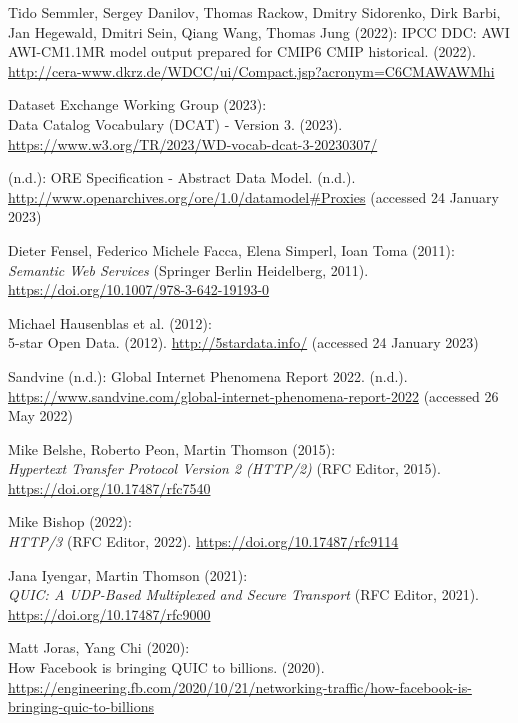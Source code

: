 \begin{thebibliography}{9}
Tido Semmler, Sergey Danilov, Thomas Rackow, Dmitry Sidorenko, Dirk
Barbi, Jan Hegewald, Dmitri Sein, Qiang Wang, Thomas Jung (2022):
IPCC DDC: AWI AWI-CM1.1MR model output prepared for CMIP6 CMIP
historical. (2022).
\url{http://cera-www.dkrz.de/WDCC/ui/Compact.jsp?acronym=C6CMAWAWMhi}

Dataset Exchange Working Group (2023): \\
{Data Catalog Vocabulary ({DCAT})
- Version 3}. (2023).
\url{https://www.w3.org/TR/2023/WD-vocab-dcat-3-20230307/}

(n.d.): {ORE Specification} - {Abstract Data Model}. (n.d.).
\url{http://www.openarchives.org/ore/1.0/datamodel\#Proxies} (accessed
24 January 2023)

Dieter Fensel, Federico Michele Facca, Elena Simperl, Ioan Toma
(2011): \\
\emph{Semantic {Web Services}} ({Springer Berlin Heidelberg},
2011).
\url{https://doi.org/10.1007/978-3-642-19193-0}

Michael Hausenblas et al. (2012): \\
5-star {Open Data}. (2012).
\url{http://5stardata.info/} (accessed 24 January 2023)

Sandvine (n.d.): Global {Internet Phenomena Report} 2022. (n.d.).
\url{https://www.sandvine.com/global-internet-phenomena-report-2022}
(accessed 26 May 2022)

Mike Belshe, Roberto Peon, Martin Thomson (2015): \\
\emph{Hypertext
{Transfer Protocol Version} 2 ({HTTP}/2)} ({RFC Editor}, 2015).
\url{https://doi.org/10.17487/rfc7540}

Mike Bishop (2022): \\
\emph{{HTTP}/3} ({RFC} Editor, 2022).
\url{https://doi.org/10.17487/rfc9114}

Jana Iyengar, Martin Thomson (2021): \\
\emph{{QUIC}: {A UDP-Based
Multiplexed} and {Secure Transport}} ({RFC Editor}, 2021).
\url{https://doi.org/10.17487/rfc9000}

Matt Joras, Yang Chi (2020): \\
How {Facebook} is bringing {QUIC} to
billions. (2020).
\url{https://engineering.fb.com/2020/10/21/networking-traffic/how-facebook-is-bringing-quic-to-billions}


\end{thebibliography}
